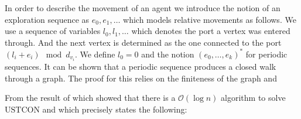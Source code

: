 \documentclass[draft,oneside]{scrartcl}
\begin{document}
In order to describe the movement of an agent we introduce the notion of an
exploration sequence as $e_{0}, e_{1},\dots$ which models relative movements
as follows. We use a sequence of variables $l_{0},l_{1},\dots$ which denotes
the port a vertex was entered through. And the next vertex is determined as the
one connected to the port $(l_{i} + e_{i}) \mod d_{v_{i}}$. We define
$l_{0} = 0$ and the notion $(e_{0},\dots,e_{k})^{\ast}$ for periodic sequences.
It can be shown that a periodic sequence produces a closed walk through a
graph. The proof for this relies on the finiteness of the graph and

From the result of \cite{logspacealg} which showed that there is a
$\mathcal{O}(\log n)$ algorithm to solve $\mathrm{USTCON}$ and which precisely
states the following:


\printbibliography
\end{document}
